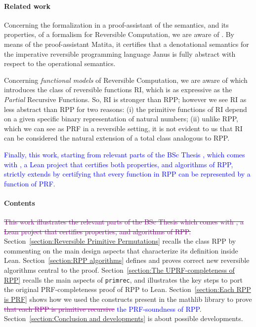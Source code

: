 \documentclass[preprint]{elsarticle}
\theoremstyle{remark}
\newcommand{\RPP}{\textsf{RPP}\xspace}
\newcommand{\PRF}{\textsf{PRF}\xspace}
\newcommand{\MATHLIB}{\textsf{mathlib}\xspace}
\newcommand{\LEAN}{\textsf{Lean}\xspace}
\newcommand{\JMF}{\textsf{RI}\xspace} %
\newcommand{\Janus}{\textsf{Janus}\xspace}
\newcommand{\Matita}{\textsf{Matita}\xspace}
\begin{document}
\paragraph{Related work}
Concerning the formalization in a proof-assistant of the semantics, and its properties, of a formalism for Reversible Computation, we are aware of \cite{paoliniTYPES2015}. By means of the proof-assistant \Matita \cite{Asperti2007}, it certifies that a denotational semantics for the imperative reversible programming language \Janus \cite[Section 8.3.3]{perumalla2013chc} is fully abstract with respect to the operational semantics.

Concerning \emph{functional models} of Reversible Computation, we are aware of \cite{jacopini89tcs} which introduces the class of reversible functions \JMF, which is as expressive as the \emph{Partial} Recursive Functions. So, \JMF is stronger than \RPP; however we see \JMF as less abstract than \RPP for two reasons: (i) the primitive functions of \JMF depend on a given specific binary representation of natural numbers; (ii) unlike \RPP, which we can see as \PRF in a reversible setting, it is not evident to us that \JMF can be considered the natural extension of a total class analogous to \RPP.

\textcolor{blue}{Finally, this work, starting from relevant parts of the BSc Thesis \cite{MalettoBSc2021}, which comes with \cite{MalettoRPPLEAN2021}, a \LEAN project that certifies both properties, and algorithms of \RPP, strictly extends \cite{MalettoR22} by certifying that every function in \RPP can be represented by a function of \PRF.}

\paragraph{Contents}
\textcolor{purple}{\sout{This work illustrates the relevant parts of the BSc Thesis \cite{MalettoBSc2021} which comes with \cite{MalettoRPPLEAN2021}, a \LEAN project that certifies properties, and algorithms of \RPP.}}
Section~\ref{section:Reversible Primitive Permutations} recalls the class \RPP by commenting on the main design aspects that characterize its definition inside \LEAN.
Section~\ref{section:RPP algorithms} defines and proves correct new reversible algorithms central to the proof.
Section~\ref{section:The UPRF-completeness of RPP} recalls the main aspects of \lstinline|primrec|, and illustrates the key steps to port the original \PRF-completeness proof of \RPP to \LEAN.
Section~\ref{section:Each RPP is PRF} shows how we used the constructs present in the \MATHLIB library to prove \textcolor{purple}{\sout{that each \RPP is primitive recursive}} \textcolor{blue}{the \PRF-soundness of \RPP}.
Section~\ref{section:Conclusion and developments} is about possible developments.
\end{document}

